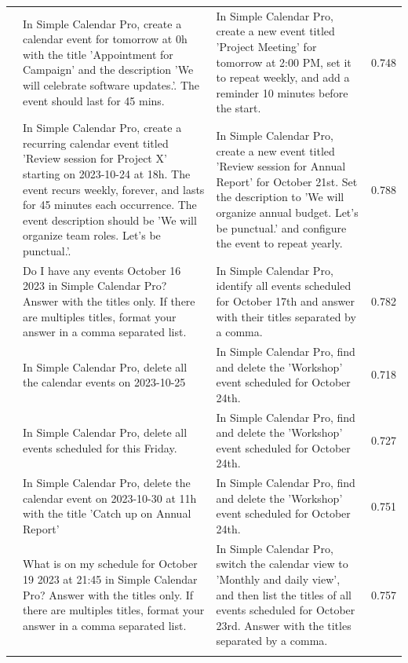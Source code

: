 \documentclass{article} %
\begin{document}
\begin{scriptsize}
\begin{longtable}{@{} c >{\raggedright\arraybackslash}p{} >{\raggedright\arraybackslash}p{} c @{}}
\addlinespace[2pt]
67 & In Simple Calendar Pro, create a calendar event for tomorrow at 0h with the title 'Appointment for Campaign' and the description 'We will celebrate software updates.'. The event should last for 45 mins. & In Simple Calendar Pro, create a new event titled 'Project Meeting' for tomorrow at 2:00 PM, set it to repeat weekly, and add a reminder 10 minutes before the start. & 0.748 \\
\addlinespace[2pt]
68 & In Simple Calendar Pro, create a recurring calendar event titled 'Review session for Project X' starting on 2023-10-24 at 18h. The event recurs weekly, forever, and lasts for 45 minutes each occurrence. The event description should be 'We will organize team roles. Let's be punctual.'. & In Simple Calendar Pro, create a new event titled 'Review session for Annual Report' for October 21st. Set the description to 'We will organize annual budget. Let's be punctual.' and configure the event to repeat yearly. & 0.788 \\
\addlinespace[2pt]
69 & Do I have any events October 16 2023 in Simple Calendar Pro? Answer with the titles only. If there are multiples titles, format your answer in a comma separated list. & In Simple Calendar Pro, identify all events scheduled for October 17th and answer with their titles separated by a comma. & 0.782 \\
\addlinespace[2pt]
70 & In Simple Calendar Pro, delete all the calendar events on 2023-10-25 & In Simple Calendar Pro, find and delete the 'Workshop' event scheduled for October 24th. & 0.718 \\
\addlinespace[2pt]
71 & In Simple Calendar Pro, delete all events scheduled for this Friday. & In Simple Calendar Pro, find and delete the 'Workshop' event scheduled for October 24th. & 0.727 \\
\addlinespace[2pt]
72 & In Simple Calendar Pro, delete the calendar event on 2023-10-30 at 11h with the title 'Catch up on Annual Report' & In Simple Calendar Pro, find and delete the 'Workshop' event scheduled for October 24th. & 0.751 \\
\addlinespace[2pt]
73 & What is on my schedule for October 19 2023 at 21:45 in Simple Calendar Pro? Answer with the titles only. If there are multiples titles, format your answer in a comma separated list. & In Simple Calendar Pro, switch the calendar view to 'Monthly and daily view', and then list the titles of all events scheduled for October 23rd. Answer with the titles separated by a comma. & 0.757 \\
\addlinespace[2pt]

\end{longtable}
\end{scriptsize}
\end{document}
